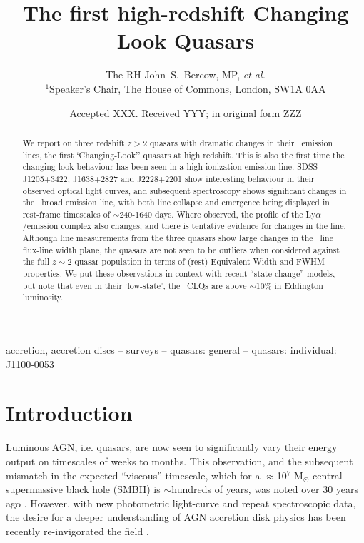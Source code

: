\documentclass[a4paper,fleqn,usenatbib]{mnras}
\title[High-redshift CLQs]{The first high-redshift Changing Look Quasars}
\author[Bercow]
{The RH John~S.~Bercow, MP, {\it et al.} 
\\
$^{1}$Speaker's Chair, The House of Commons, London, SW1A 0AA \\
}
\date{Accepted XXX. Received YYY; in original form ZZZ}
\begin{document}
\label{firstpage}
\pagerange{\pageref{firstpage}--\pageref{lastpage}}
\maketitle

\begin{abstract}
We report on three redshift $z>2$ quasars with dramatic changes in
their \civ\ emission lines, the first `Changing-Look'' quasars at high
redshift.  This is also the first time the changing-look behaviour has
been seen in a high-ionization emission line.
SDSS J1205+3422, J1638+2827 and J2228+2201 show interesting behaviour
in their observed optical light curves, and subsequent spectroscopy
shows significant changes in the \civ\ broad emission line, with both
line collapse and emergence being displayed in rest-frame timescales
of $\sim$240-1640 days.
Where observed, the profile of the Ly$\alpha$/\nv emission complex
also changes, and there is tentative evidence for changes in the \mgii
line.
Although line measurements from the three quasars show large changes
in the \civ\ line flux-line width plane, the quasars are not seen to
be outliers when considered against the full $z\sim2$ quasar population
in terms of (rest) Equivalent Width and FWHM properties.
We put these observations in context with recent ``state-change''
models, but note that even in their `low-state', the \civ\ CLQs are
above $\sim$10\% in Eddington luminosity.
\end{abstract}



\begin{keywords}
accretion, accretion discs -- surveys -- quasars: general -- quasars: individual: J1100-0053 
\end{keywords}



\section{Introduction}
Luminous AGN, i.e. quasars, are now seen to significantly vary their
energy output on timescales of weeks to months.  This observation, and
the subsequent mismatch in the expected ``viscous'' timescale, which
for a $\approx$10$^{7}$ M$_{\odot}$ central supermassive black hole
(SMBH) is $\sim$hundreds of years, was noted over 30 years ago
\citep[e.g.][]{Alloin1985}. However, with new photometric light-curve
and repeat spectroscopic data, the desire for a deeper understanding
of AGN accretion disk physics has been recently re-invigorated the
field \citep[e.g.][]{Lawrence2018, Antonucci2018}.
\end{document}
